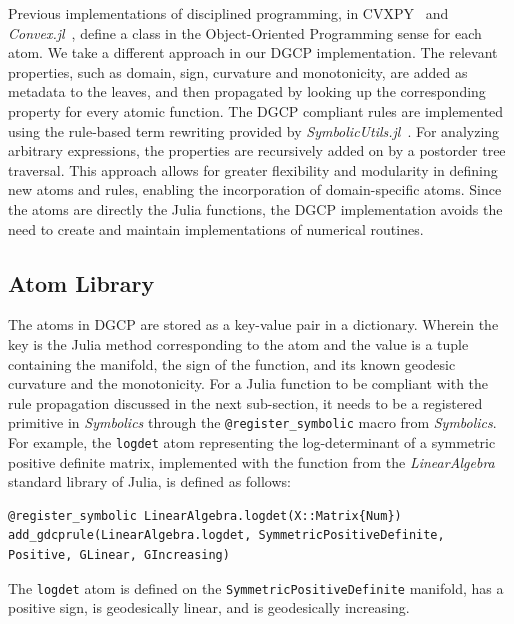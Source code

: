 \documentclass[twoside,11pt]{article}
\begin{document}
Previous implementations of disciplined programming, in CVXPY~\citep{diamond2016cvxpy} and \textsl{Convex.jl}~\citep{udell2014convex}, define a class in the Object-Oriented Programming %
sense for each atom. We take a different approach in our DGCP implementation. The relevant properties, such as domain, sign, curvature and monotonicity, are added as metadata to the leaves, and then propagated by looking up the corresponding property for every atomic function. The DGCP compliant rules are implemented using the rule-based term rewriting provided by \textsl{SymbolicUtils.jl}~\citep{symutils}. For analyzing arbitrary expressions, the properties are recursively added on by a postorder tree traversal. This approach allows for greater flexibility and modularity in defining new atoms and rules, enabling the incorporation of domain-specific atoms. Since the atoms are directly the Julia functions, the DGCP implementation avoids the need to create and maintain implementations of numerical routines.

\subsection{Atom Library}

The atoms in DGCP are stored as a key-value pair in a dictionary. Wherein the key is the Julia method corresponding to the atom and the value is a tuple containing the manifold, the sign of the function, and its known geodesic curvature and the monotonicity. For a Julia function to be compliant with the rule propagation discussed in the next sub-section, it needs to be a registered primitive in \textsl{Symbolics} through the \verb|@register_symbolic| macro from \textsl{Symbolics}.         
For example, the \texttt{logdet} atom representing the log-determinant of a symmetric positive definite matrix, implemented with the function from the \textsl{LinearAlgebra} standard library of Julia, is defined as follows:

\begin{listing}[h!]
\label{logdetatom}
\begin{verbatim}
@register_symbolic LinearAlgebra.logdet(X::Matrix{Num})
add_gdcprule(LinearAlgebra.logdet, SymmetricPositiveDefinite, Positive, GLinear, GIncreasing)
\end{verbatim}

\caption{The \texttt{logdet} atom is defined on the \texttt{SymmetricPositiveDefinite} manifold, has a positive sign, is geodesically linear, and is geodesically increasing.}

\end{listing}
\end{document}
